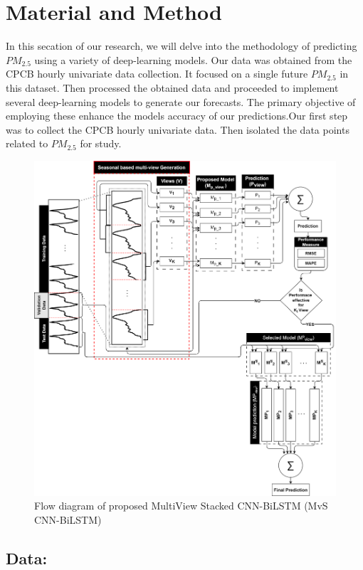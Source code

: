 \documentclass[a4paper,fleqn]{cas-sc}
\begin{document}
\section{Material and Method}
In this secation of our research, we will delve into the methodology of predicting $PM_{2.5}$ using a variety of deep-learning models. Our data was obtained from the CPCB hourly univariate data collection. It focused on a single future $PM_{2.5}$ in this dataset. Then processed the obtained data and proceeded to implement several deep-learning models to generate our forecasts. The primary objective of employing these enhance the models accuracy of our predictions.Our first step was to collect the CPCB hourly univariate data. Then isolated the data points related to $PM_{2.5}$ for study.
\begin{figure}[h!]
	\centering
		\includegraphics[scale=0.6]{img/MvS CNN-BiLSTM}
	  \caption{Flow diagram of proposed MultiView Stacked CNN-BiLSTM (MvS CNN-BiLSTM)}\label{Muticbilstm}
\end{figure}


\subsection{Data:}
\end{document}
